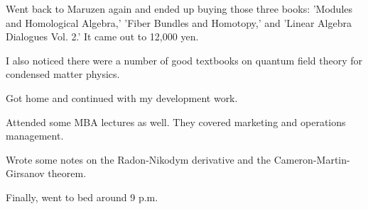 \documentclass[uplatex]{jsarticle}
\begin{document}
Went back to Maruzen again and ended up buying those three books: 'Modules and Homological Algebra,' 'Fiber Bundles and Homotopy,' and 'Linear Algebra Dialogues Vol. 2.' It came out to 12,000 yen.

I also noticed there were a number of good textbooks on quantum field theory for condensed matter physics.

Got home and continued with my development work.

Attended some MBA lectures as well. They covered marketing and operations management.

Wrote some notes on the Radon-Nikodym derivative and the Cameron-Martin-Girsanov theorem.

Finally, went to bed around 9 p.m.
\end{document}
